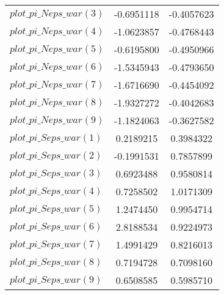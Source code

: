 \begin{center}
\begin{longtable}{lcc}
$plot\_pi\_N eps\_war (3)   $	 & 	     -0.6951118	 & 	     -0.4057623 \\ 
$plot\_pi\_N eps\_war (4)   $	 & 	     -1.0623857	 & 	     -0.4768443 \\ 
$plot\_pi\_N eps\_war (5)   $	 & 	     -0.6195800	 & 	     -0.4950966 \\ 
$plot\_pi\_N eps\_war (6)   $	 & 	     -1.5345943	 & 	     -0.4793650 \\ 
$plot\_pi\_N eps\_war (7)   $	 & 	     -1.6716690	 & 	     -0.4454092 \\ 
$plot\_pi\_N eps\_war (8)   $	 & 	     -1.9327272	 & 	     -0.4042683 \\ 
$plot\_pi\_N eps\_war (9)   $	 & 	     -1.1824063	 & 	     -0.3627582 \\ 
$plot\_pi\_S eps\_war (1)   $	 & 	      0.2189215	 & 	      0.3984322 \\ 
$plot\_pi\_S eps\_war (2)   $	 & 	     -0.1991531	 & 	      0.7857899 \\ 
$plot\_pi\_S eps\_war (3)   $	 & 	      0.6923488	 & 	      0.9580814 \\ 
$plot\_pi\_S eps\_war (4)   $	 & 	      0.7258502	 & 	      1.0171309 \\ 
$plot\_pi\_S eps\_war (5)   $	 & 	      1.2474450	 & 	      0.9954714 \\ 
$plot\_pi\_S eps\_war (6)   $	 & 	      2.8188534	 & 	      0.9224973 \\ 
$plot\_pi\_S eps\_war (7)   $	 & 	      1.4991429	 & 	      0.8216013 \\ 
$plot\_pi\_S eps\_war (8)   $	 & 	      0.7194728	 & 	      0.7098160 \\ 
$plot\_pi\_S eps\_war (9)   $	 & 	      0.6508585	 & 	      0.5985710 \\ 
\end{longtable}
 \end{center}
